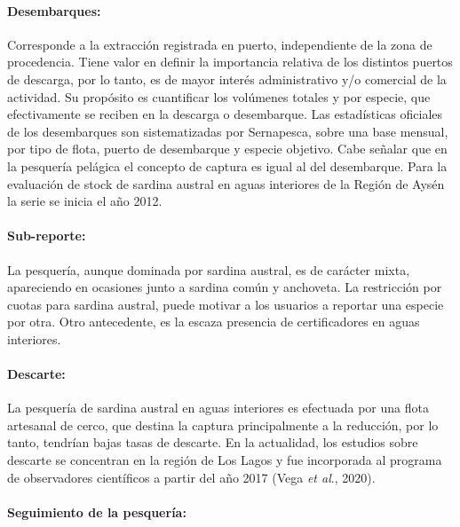 \documentclass[
  spanish,
]{article}
\begin{document}
\hypertarget{desembarques}{%
\paragraph{Desembarques:}\label{desembarques}}

\quad

Corresponde a la extracción registrada en puerto, independiente de la
zona de procedencia. Tiene valor en definir la importancia relativa de
los distintos puertos de descarga, por lo tanto, es de mayor interés
administrativo y/o comercial de la actividad. Su propósito es
cuantificar los volúmenes totales y por especie, que efectivamente se
reciben en la descarga o desembarque. Las estadísticas oficiales de los
desembarques son sistematizadas por Sernapesca, sobre una base mensual,
por tipo de flota, puerto de desembarque y especie objetivo. Cabe
señalar que en la pesquería pelágica el concepto de captura es igual al
del desembarque. Para la evaluación de stock de sardina austral en aguas
interiores de la Región de Aysén la serie se inicia el año 2012.

\hypertarget{sub-reporte}{%
\paragraph{Sub-reporte:}\label{sub-reporte}}

\quad

La pesquería, aunque dominada por sardina austral, es de carácter mixta,
apareciendo en ocasiones junto a sardina común y anchoveta. La
restricción por cuotas para sardina austral, puede motivar a los
usuarios a reportar una especie por otra. Otro antecedente, es la escaza
presencia de certificadores en aguas interiores.

\hypertarget{descarte}{%
\paragraph{Descarte:}\label{descarte}}

\quad

La pesquería de sardina austral en aguas interiores es efectuada por una
flota artesanal de cerco, que destina la captura principalmente a la
reducción, por lo tanto, tendrían bajas tasas de descarte. En la
actualidad, los estudios sobre descarte se concentran en la región de
Los Lagos y fue incorporada al programa de observadores científicos a
partir del año 2017 (Vega \emph{et al}., 2020).

\hypertarget{seguimiento-de-la-pesqueruxeda}{%
\paragraph{Seguimiento de la
pesquería:}\label{seguimiento-de-la-pesqueruxeda}}
\end{document}
